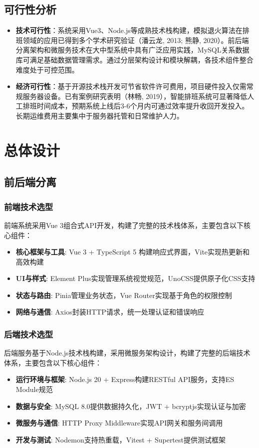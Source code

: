 \documentclass{ctexart}
\begin{document}
\subsection{可行性分析}
\begin{itemize}
    \item \textbf{技术可行性}：系统采用Vue3、Node.js等成熟技术栈构建，模拟退火算法在排班领域的应用已得到多个学术研究验证（潘云龙, 2013; 熊静, 2020）。前后端分离架构和微服务技术在大中型系统中具有广泛应用实践，MySQL关系数据库可满足基础数据管理需求。通过分层架构设计和模块解耦，各技术组件整合难度处于可控范围。

    \item \textbf{经济可行性}：基于开源技术栈开发可节省软件许可费用，项目硬件投入仅需常规服务器设备。已有案例研究表明（林畅, 2019），智能排班系统可显著降低人工排班时间成本，预期系统上线后3-6个月内可通过效率提升收回开发投入。长期运维费用主要集中于服务器托管和日常维护人力。
\end{itemize}

\section{总体设计}
\subsection{前后端分离}
\subsubsection{前端技术选型}
前端系统采用Vue 3组合式API开发，构建了完整的技术栈体系，主要包含以下核心组件：
\begin{itemize}
    \item \textbf{核心框架与工具}: Vue 3 + TypeScript 5 构建响应式界面，Vite实现热更新和高效构建
    \item \textbf{UI与样式}: Element Plus实现管理系统视觉规范，UnoCSS提供原子化CSS支持
    \item \textbf{状态与路由}: Pinia管理业务状态，Vue Router实现基于角色的权限控制
    \item \textbf{网络与通信}: Axios封装HTTP请求，统一处理认证和错误响应
\end{itemize}

\subsubsection{后端技术选型}
后端服务基于Node.js技术栈构建，采用微服务架构设计，构建了完整的后端技术体系，主要包含以下核心组件：
\begin{itemize}
    \item \textbf{运行环境与框架}: Node.js 20 + Express构建RESTful API服务，支持ES Module规范
    \item \textbf{数据与安全}: MySQL 8.0提供数据持久化，JWT + bcryptjs实现认证与加密
    \item \textbf{微服务与通信}: HTTP Proxy Middleware实现API网关和服务间调用
    \item \textbf{开发与测试}: Nodemon支持热重载，Vitest + Supertest提供测试框架
\end{itemize}
\end{document}
